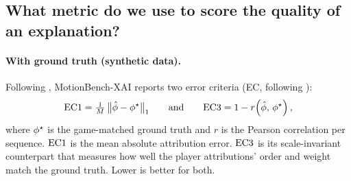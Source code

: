 
\subsection{What metric do we use to score the quality of an explanation?}
\label{sec:bg-metrics}

\paragraph{With ground truth (synthetic data).} Following
\citet{aas2021explaining,olsen2022using}, MotionBench-XAI reports two error criteria (EC, following \citet{olsen2022using}):
\begin{equation}
  \mathrm{EC1} = \tfrac{1}{M}\,\big\lVert \hat{\phi} - \phi^{\star} \big\rVert_1
  \qquad\text{and}\qquad
  \mathrm{EC3} = 1 - r\!\left(\hat{\phi},\, \phi^{\star}\right),
\end{equation}
where $\phi^{\star}$ is the game-matched ground truth and $r$ is the Pearson
correlation per sequence. $\mathrm{EC1}$ is the mean absolute attribution error.
$\mathrm{EC3}$ is its scale-invariant counterpart that measures how well the player attributions' order and weight match the ground truth. Lower is better for both.

